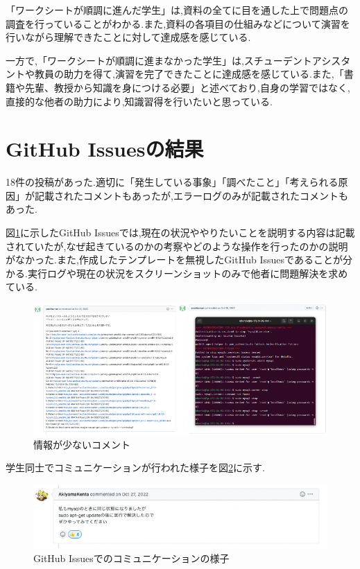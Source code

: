 \documentclass[11pt, a4paper]{jreport}
\begin{document}
「ワークシートが順調に進んだ学生」は,資料の全てに目を通した上で問題点の調査を行っていることがわかる.また,資料の各項目の仕組みなどについて演習を行いながら理解できたことに対して達成感を感じている.

一方で,「ワークシートが順調に進まなかった学生」は,スチューデントアシスタントや教員の助力を得て,演習を完了できたことに達成感を感じている.また,「書籍や先輩、教授から知識を身につける必要」と述べており,自身の学習ではなく,直接的な他者の助力により,知識習得を行いたいと思っている.

\section{GitHub Issuesの結果}

18件の投稿があった.適切に「発生している事象」「調べたこと」「考えられる原因」が記載されたコメントもあったが,エラーログのみが記載されたコメントもあった.

図\ref{fig:lognomi}に示したGitHub Issuesでは,現在の状況ややりたいことを説明する内容は記載されていたが,なぜ起きているのかの考察やどのような操作を行ったのかの説明がなかった.また,作成したテンプレートを無視したGitHub Issuesであることが分かる.実行ログや現在の状況をスクリーンショットのみで他者に問題解決を求めている.

\begin{figure}[H]
\begin{center}
\includegraphics[width=140mm]{./img/lognomi.png}
\caption{情報が少ないコメント}
\label{fig:lognomi}
\end{center}
\end{figure}

学生同士でコミュニケーションが行われた様子を図\ref{fig:issuehennsin}に示す.

\begin{figure}[H]
\begin{center}
\includegraphics[width=140mm]{./img/issuehennsin.png}
\caption{GitHub Issuesでのコミュニケーションの様子}
\label{fig:issuehennsin}
\end{center}
\end{figure}
\end{document}
